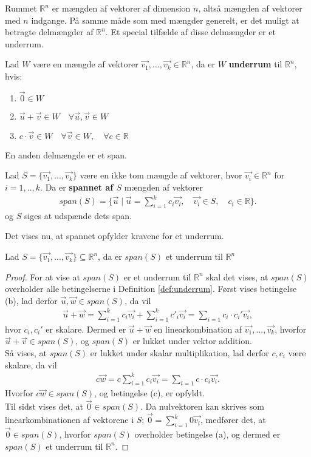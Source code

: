 \newline
Rummet $\mathds{R}^n$ er mængden af vektorer af dimension $n$, altså mængden af vektorer med $n$ indgange. På samme måde som med mængder generelt, er det muligt at betragte delmængder af $\mathds{R}^n$.
Et special tilfælde af disse delmængder er et underrum.
\begin{defn}[Underrum]
Lad $W$ være en mængde af vektorer $\vec{v_1},...,\vec{v_k} \in \mathds{R}^n$, da er $W$  \textbf{underrum} til $\mathds{R}^n$, hvis:
\begin{enumerate}[label=(\alph*)]
\item $\vec{0} \in W$
\item $\vec{u}+\vec{v} \in W \quad \forall \vec{u}, \vec{v} \in W$
\item $c \cdot \vec{v} \in W \quad \forall \vec{v} \in W, \quad \forall c \in \mathds{R}$
\end{enumerate}
\label{def:underrum}
\end{defn}
En anden delmængde er et span.
\begin{defn}[Span]
Lad $S=\{\vec{v_1},...,\vec{v_k}\}$ være en ikke tom mængde af vektorer, hvor $\vec{v_i} \in \mathds{R}^n$ for $i = 1,..,k$. 
Da er \textbf{spannet af $S$} mængden af vektorer
\begin{align*}
span(S) = \{\vec{u} \mid \vec{u}=\sum_{i=1}^k c_i \vec{v_i}, \quad \vec{v_i} \in S, \quad c_i \in \mathds{R}\}.
\end{align*} 
og $S$ siges at udspænde dets span.
\label{def:span}
\end{defn}
Det vises nu, at spannet opfylder kravene for et underrum.
\begin{stn}
Lad $S=\{\vec{v_1},...,\vec{v_k}\} \subseteq \mathds{R}^n$, da er $span(S)$ et underrum til $\mathds{R}^n$
\label{stn:spanunderrum}
\end{stn}
\begin{proof}
For at vise at $span(S)$ er et underrum til $\mathds{R}^n$ skal det vises, at $span(S)$ overholder alle betingelserne i Definition \ref{def:underrum}.
Først vises betingelse (b), lad  derfor $\vec{u}, \vec{w} \in span(S)$, da vil 
\begin{align*}
\vec{u}+\vec{w}= \sum_{i=1}^k c_i \vec{v_i} + \sum_{i=1}^k c'_i \vec{v_i} = \sum_{i=1} c_i\cdot c_i' \vec{v_i},
\end{align*}
hvor $c_i, c_i'$ er skalare.
Dermed er $\vec{u}+\vec{w}$ en linearkombination af $\vec{v_1},...,\vec{v_k}$, hvorfor $\vec{u}+\vec{v} \in span(S)$, og $span(S)$ er lukket under vektor addition.
\\ Så vises, at $span(S)$ er lukket under skalar multiplikation, lad derfor $c, c_i$ være skalare, da vil
\begin{align*}
c\vec{w}= c\sum_{i=1}^k c_i \vec{v_i}  = \sum_{i=1} c \cdot c_i \vec{v_i}.
\end{align*}
Hvorfor $c\vec{w} \in span(S)$, og betingelse (c), er opfyldt.
\\Til sidst vises det, at $\vec{0} \in span(S)$.
Da nulvektoren kan skrives som linearkombinationen af vektorene i $S$; $\vec{0} = \sum_{i=1}^k 0 \vec{v_i}$, medfører det, at $\vec{0} \in span(S)$, hvorfor $span(S)$ overholder betingelse (a), og dermed er $span(S)$ et underrum til $\mathds{R}^n$.
\end{proof}
